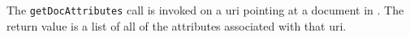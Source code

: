The \verb+getDocAttributes+ call is invoked on a uri pointing at a document in \Rapture. The return value is
a list of all of the attributes associated with that uri.
